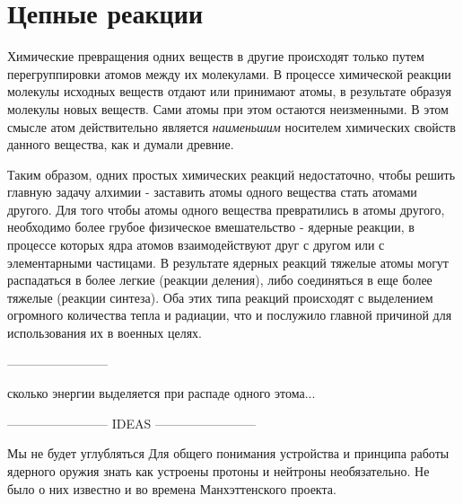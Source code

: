 \section*{Цепные реакции}

Химические превращения одних веществ в другие происходят только путем перегруппировки атомов между их молекулами.
В процессе химической реакции молекулы исходных веществ отдают или принимают атомы, в результате образуя молекулы новых веществ. 
Сами атомы при этом остаются неизменными.
В этом смысле атом действительно является \textit{наименьшим} носителем химических свойств данного вещества, как и думали древние.

Таким образом, одних простых химических реакций недостаточно, чтобы решить главную задачу алхимии - заставить атомы одного вещества стать атомами другого.
Для того чтобы атомы одного вещества превратились в атомы другого, необходимо более грубое физическое вмешательство - ядерные реакции, в процессе которых ядра атомов взаимодействуют друг с другом или с элементарными частицами.
В результате ядерных реакций тяжелые атомы могут распадаться в более легкие (реакции деления), либо соединяться в еще более тяжелые (реакции синтеза).
Оба этих типа реакций происходят с выделением огромного количества тепла и радиации, что и послужило главной причиной для использования их в военных целях.

------------------------

сколько энергии выделяется при распаде одного этома...





------------------------ IDEAS ------------------------ 



Мы не будет углубляться 
Для общего понимания устройства и принципа работы ядерного оружия знать как устроены протоны и нейтроны необязательно. 
Не было о них известно и во времена Манхэттенского проекта.





